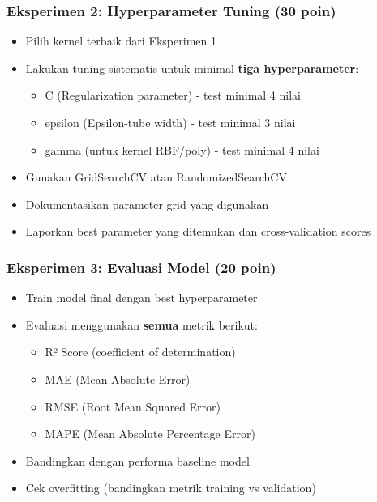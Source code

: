 \documentclass[12pt,a4paper]{article}
\begin{document}
\subsubsection{Eksperimen 2: Hyperparameter Tuning (30 poin)}
\begin{itemize}
    \item Pilih kernel terbaik dari Eksperimen 1
    \item Lakukan tuning sistematis untuk minimal \textbf{tiga hyperparameter}:
    \begin{itemize}
        \item C (Regularization parameter) - test minimal 4 nilai
        \item epsilon (Epsilon-tube width) - test minimal 3 nilai
        \item gamma (untuk kernel RBF/poly) - test minimal 4 nilai
    \end{itemize}
    \item Gunakan GridSearchCV atau RandomizedSearchCV
    \item Dokumentasikan parameter grid yang digunakan
    \item Laporkan best parameter yang ditemukan dan cross-validation scores
\end{itemize}

\subsubsection{Eksperimen 3: Evaluasi Model (20 poin)}
\begin{itemize}
    \item Train model final dengan best hyperparameter
    \item Evaluasi menggunakan \textbf{semua} metrik berikut:
    \begin{itemize}
        \item R² Score (coefficient of determination)
        \item MAE (Mean Absolute Error)
        \item RMSE (Root Mean Squared Error)
        \item MAPE (Mean Absolute Percentage Error)
    \end{itemize}
    \item Bandingkan dengan performa baseline model
    \item Cek overfitting (bandingkan metrik training vs validation)
\end{itemize}
\end{document}
